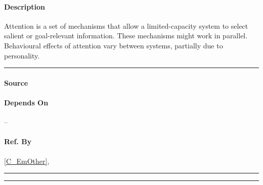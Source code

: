 \paragraph{Description} Attention is a set of mechanisms that allow a
limited-capacity system to select salient or goal-relevant information. These
mechanisms might work in parallel. Behavioural effects of attention vary
between systems, partially due to personality. \\\hrule

\paragraph{Source} \cite{oxfordAttention}

\paragraph{Depends On} --

\paragraph{Ref. By} \cref{C_EmOther}, 
\\\hrule\vspace{0.5mm}\hrule